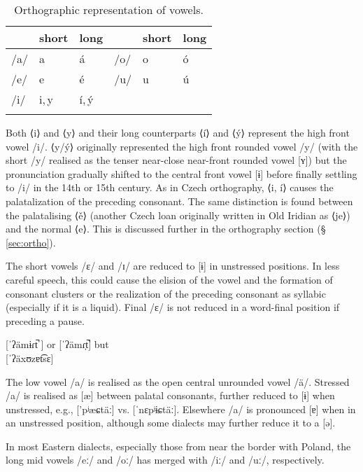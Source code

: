 \begin{table}[ht!]
	\footnotesize\sffamily
	\caption{Orthographic representation of vowels.}
	\medskip
	\begin{tabularx}{0.7\textwidth}{@{}YYYYYY@{}}
		\toprule
		& {\sc short} & {\sc long} & & {\sc short} & {\sc long}\\
		\midrule
		/a/ & a 	&á 			& /o/ 	& o &ó \\
		/e/ & e 	&é 			& /u/ 	& u &ú\\
		/i/ & i,\,y &í,\,\'y 	& 		& 	&\\
		\bottomrule
		\label{table:vowels-orth}
	\end{tabularx}
\end{table}

Both ⟨i⟩ and ⟨y⟩ and their long counterparts ⟨í⟩ and ⟨ý⟩ represent the high front vowel /i/. ⟨y/ý⟩ originally represented the high front rounded vowel /y/ (with the short /y/ realised as the tenser near-close near-front rounded vowel [ʏ]) but the pronunciation gradually shifted to the central front vowel [ɨ] before finally settling to /i/ in the 14th or 15th century. As in Czech orthography, ⟨i, í⟩ causes the palatalization of the preceding consonant. The same distinction is found between the palatalising ⟨ě⟩ (another Czech loan originally written in Old Iridian as ⟨je⟩) and the normal ⟨e⟩. This is discussed further in the orthography section (\S\,\ref{sec:ortho}).

The short vowels /ɛ/ and /ɪ/ are reduced to [ɨ] in unstressed positions. In less careful speech, this could cause the elision of the vowel and the formation of consonant clusters or the realization of the preceding consonant as syllabic (especially if it is a liquid). Final /ɛ/ is not reduced in a word-final position if preceding a pause.

\ex
	 [ˈʔämɨɾt̚ ] or [ˈʔämɾ̩t̚] but\\
	 [ˈʔäxʊzɐt͡sɛ]
\xe

The low vowel /a/ is realised as the open central unrounded vowel /\"a/. Stressed /a/ is realised as [\ae] between palatal consonants, further reduced to [ɨ] when unstressed, e.g.,  ['pʲæɕtäː] vs.  [ˈnɛpʲɨɕtäː]. Elsewhere /a/ is pronounced [ɐ] when in an unstressed position, although some dialects may further reduce it to a [ə].

In most Eastern dialects, especially those from near the border with Poland, the long mid vowels /eː/ and /oː/ has merged with /iː/ and /uː/, respectively.

